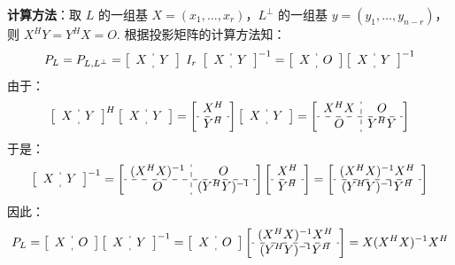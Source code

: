 \noindent\textbf{计算方法}：取 $L$ 的一组基 $X=(x_1,\ldots,x_r)$，$L^{\perp}$ 的一组基 $y=(y_1,\ldots,y_{n-r})$，则 $X^HY=Y^HX=O$.  根据投影矩阵的计算方法知：
\[
    P_L=P_{L,L^\perp}
    =\left[\begin{array}{c:c}X&Y\end{array}\right]\;I_r\;\left[\begin{array}{c:c}X&Y\end{array}\right]^{-1}
    =\left[\begin{array}{c:c}X&O\end{array}\right]\left[\begin{array}{c:c}X&Y\end{array}\right]^{-1}
\]
由于：
\[
    \left[\begin{array}{c:c}X&Y\end{array}\right]^{H}\left[\begin{array}{c:c}X&Y\end{array}\right]=\left[\begin{array}{c}X^H\\\hdashline Y^H\end{array}\right]\left[\begin{array}{c:c}X&Y\end{array}\right]=\left[\begin{array}{c:c}X^HX&O\\\hdashline O&Y^HY\end{array}\right]
\]
于是：
\[
    \left[\begin{array}{c:c}X&Y\end{array}\right]^{-1}=\left[\begin{array}{c:c}(X^HX)^{-1}&O\\\hdashline O&(Y^HY)^{-1}\end{array}\right]\left[\begin{array}{c}X^H\\\hdashline Y^H\end{array}\right]=\left[\begin{array}{c}(X^HX)^{-1}X^H\\\hdashline(Y^HY)^{-1}Y^H\end{array}\right]
\]
因此：
\[
    P_L=\left[\begin{array}{c:c}X&O\end{array}\right]\left[\begin{array}{c:c}X&Y\end{array}\right]^{-1}=\left[\begin{array}{c:c}X&O\end{array}\right]\left[\begin{array}{c}(X^HX)^{-1}X^H\\\hdashline(Y^HY)^{-1}Y^H\end{array}\right]=X(X^HX)^{-1}X^H
\]

